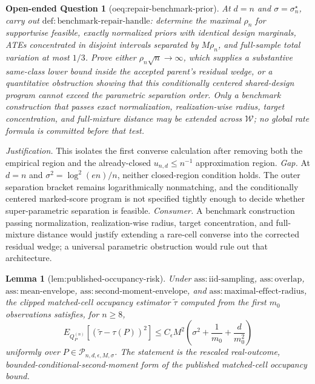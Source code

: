 \documentclass{article}
\newtheorem{lemma}{Lemma}
\newtheorem{openendedquestion}{Open-ended Question}
\begin{document}
\begin{openendedquestion}[oeq:repair-benchmark-prior]\label{oeq:repair-benchmark-prior}
At \(d=n\) and \(\sigma=\sigma_n^\star\), carry out \(\mathrm{def:benchmark\text{-}repair\text{-}handle}\): determine the maximal \(\rho_n\) for supportwise feasible, exactly normalized priors with identical design marginals, ATEs concentrated in disjoint intervals separated by \(M\rho_n\), and full-sample total variation at most \(1/3\). Prove either \(\rho_n\sqrt n\to\infty\), which supplies a substantive same-class lower bound inside the accepted parent's residual wedge, or a quantitative obstruction showing that this conditionally centered shared-design program cannot exceed the parametric separation order. Only a benchmark construction that passes exact normalization, realization-wise radius, target concentration, and full-mixture distance may be extended across \(\mathcal W\); no global rate formula is committed before that test.
\end{openendedquestion}
\par\smallskip\noindent \textit{Justification.} This isolates the first converse calculation after removing both the empirical region and the already-closed \(u_{n,d}\le n^{-1}\) approximation region. \textit{Gap.} At \(d=n\) and \(\sigma^2=\log^2(en)/n\), neither closed-region condition holds.  The outer separation bracket remains logarithmically nonmatching, and the conditionally centered marked-score program is not specified tightly enough to decide whether super-parametric separation is feasible. \textit{Consumer.} A benchmark construction passing normalization, realization-wise radius, target concentration, and full-mixture distance would justify extending a rare-cell converse into the corrected residual wedge; a universal parametric obstruction would rule out that architecture.

\begin{lemma}[lem:published-occupancy-risk]\label{lem:published-occupancy-risk}
Under \(\mathrm{ass:iid\text{-}sampling}\), \(\mathrm{ass:overlap}\), \(\mathrm{ass:mean\text{-}envelope}\), \(\mathrm{ass:second\text{-}moment\text{-}envelope}\), and \(\mathrm{ass:maximal\text{-}effect\text{-}radius}\), the clipped matched-cell occupancy estimator \(\widetilde\tau\) computed from the first \(m_0\) observations satisfies, for \(n\geq 8\),
\[
 E_{Q_P^{(n)}}\!\left[(\widetilde\tau-\tau(P))^2\right]
 \leq C_{\epsilon}M^2\left(\sigma^2+\frac1{m_0}+\frac d{m_0^2}\right)
\]
uniformly over \(P\in\mathcal P_{n,d,\epsilon,M,\sigma}\).  The statement is the rescaled real-outcome, bounded-conditional-second-moment form of the published matched-cell occupancy bound.
\end{lemma}
\end{document}
